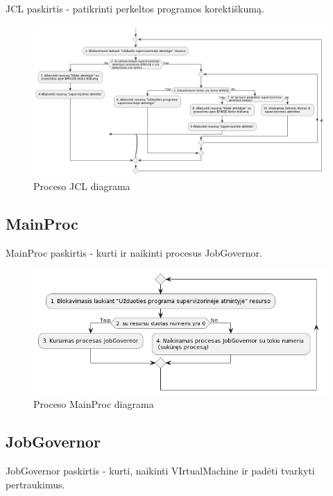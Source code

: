 \documentclass{VUMIFInfKursinis}
\begin{document}
JCL paskirtis - patikrinti perkeltos programos korektiškumą.

\begin{figure}[H]
	\centering	
	\includegraphics[scale=1.5]{img/JCL}
	\caption{Proceso JCL diagrama}   %
	\label{img:JCL}
\end{figure}

\subsection{MainProc}

MainProc paskirtis - kurti ir naikinti procesus JobGovernor.

\begin{figure}[H]
	\centering	
	\includegraphics[scale=0.40]{img/MainProc}
	\caption{Proceso MainProc diagrama}   %
	\label{img:MainProc}
\end{figure}

\subsection{JobGovernor}

JobGovernor paskirtis - kurti, naikinti VIrtualMachine ir padėti tvarkyti pertraukimus.
\end{document}
